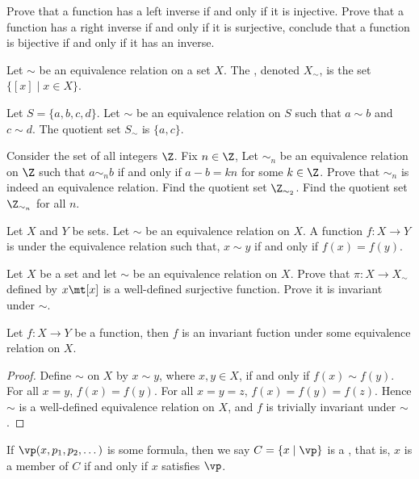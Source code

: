 \documentclass[10pt]{article}
\begin{document}
\begin{problem}
    Prove that a function has a left inverse if and only if it is injective. Prove that a function has a right inverse if and only if it is surjective, conclude that a function is bijective if and only if it has an inverse.
\end{problem}
\begin{definition}
    Let $\sim$ be an equivalence relation on a set $X$. The , denoted ${X}_{\sim}$, is the set $\{[x]\mid x\in X\}$.
\end{definition}
\begin{example}
    Let $S=\{a,b,c,d\}$. Let $\sim$ be an equivalence relation on $S$ such that $a\sim b$ and $c\sim d$. The quotient set ${S}_{\sim}$ is $\{a,c\}$.
\end{example}
\begin{problem}
    Consider the set of all integers $\Z$. Fix $n\in\Z$, Let ${\sim}_{n}$ be an equivalence relation on $\Z$ such that $a{\sim}_{n}b$ if and only if $a-b=kn$ for some $k\in\Z$. Prove that ${\sim}_{n}$ is indeed an equivalence relation. Find the quotient set ${\Z}_{{\sim}_{2}}$. Find the quotient set ${\Z}_{{\sim}_{n}}$ for all $n$.
\end{problem}
\begin{definition}
    Let $X$ and $Y$ be sets. Let $\sim$ be an equivalence relation on $X$. A function $f:X\to Y$ is  under the equivalence relation such that, $x\sim y$ if and only if $f(x)=f(y)$.
\end{definition}
\begin{problem}
    Let $X$ be a set and let $\sim$ be an equivalence relation on $X$. Prove that $\pi:X\to{X}_{\sim}$ defined by $x\mt[x]$ is a well-defined surjective function. Prove it is invariant under $\sim$.
\end{problem}
\begin{proposition}
    Let $f:X\to Y$ be a function, then $f$ is an invariant fuction under some equivalence relation on $X$.
\end{proposition}
\begin{proof}
    Define $\sim$ on $X$ by $x\sim y$, where $x,y\in X$, if and only if $f(x)\sim f(y)$. For all $x=y$, $f(x)=f(y)$. For all $x=y=z$, $f(x)=f(y)=f(z)$. Hence $\sim$ is a well-defined equivalence relation on $X$, and $f$ is trivially invariant under $\sim$.
\end{proof}
\begin{definition}
    If $\vp(x,{p}_{1},{p}_{2},\dots)$ is some formula, then we say $C=\{x\mid\vp\}$ is a , that is, $x$ is a member of $C$ if and only if $x$ satisfies $\vp$.
\end{definition}
\end{document}
